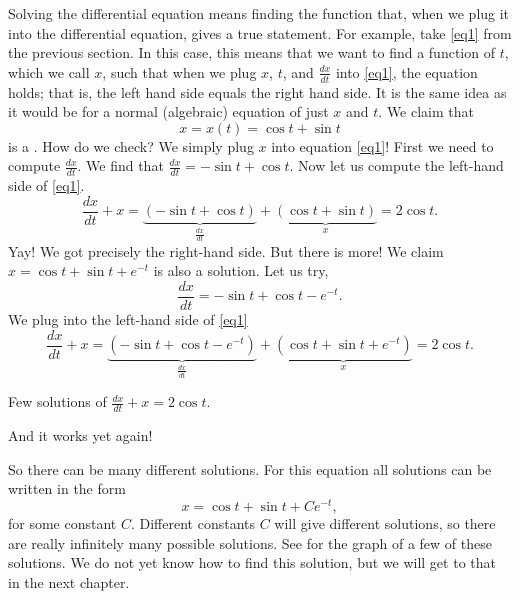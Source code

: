 Solving the differential equation means finding the function that, when we plug it into the differential equation, gives a true statement. For example, take \eqref{eq1} from the previous section. In this case, this means that we want to find a function of $t$, which we call $x$, such that when
we plug $x$, $t$, and $\frac{dx}{dt}$ into \eqref{eq1}, the equation holds;
that is, the left hand side equals the right hand side.
It is
the same idea as it would be for a normal (algebraic) equation of just
$x$ and $t$.  We claim that
\begin{equation*}
x = x(t) = \cos t + \sin t
\end{equation*}
is a \emph{}.
How do we check?  We simply plug $x$ into equation \eqref{eq1}!  First we
need to compute $\frac{dx}{dt}$.  We find that $\frac{dx}{dt} = 
-\sin t + \cos t$.  Now let us compute the left-hand side
of \eqref{eq1}.
\begin{equation*}
\frac{dx}{dt} + x = 
\underbrace{(-\sin t + \cos t)}_{\frac{dx}{dt}}
+
\underbrace{(\cos t + \sin t)}_{x}
=
2\cos t .
\end{equation*}
Yay!  We got precisely the right-hand side.
But there is more!
We claim
$x = \cos t + \sin t + e^{-t}$ is also
a solution.  Let us try,
\begin{equation*}
\frac{dx}{dt} = -\sin t + \cos t - e^{-t} .
\end{equation*}
We plug into the left-hand side of \eqref{eq1}
\begin{equation*}
\frac{dx}{dt} + x = 
\underbrace{(-\sin t + \cos t - e^{-t})}_{\frac{dx}{dt}} +
\underbrace{(\cos t + \sin t + e^{-t})}_{x}
= 2\cos t .
\end{equation*}

\begin{mywrapfig}{2.75in}
\capstart
{}
\caption{Few solutions of $\frac{dx}{dt} + x = 2 \cos t$.\label{intro:plotsfig}}
\end{mywrapfig}%

And it works yet again!

So there can be many different solutions.  For this equation all
solutions can be written in the form
\begin{equation*}
x = \cos t + \sin t + C e^{-t} ,
\end{equation*}
for some constant $C$.  Different constants $C$ will give different
solutions, so there are really infinitely many possible solutions.
See  for the graph of a
few of these solutions. 
We do not yet know how to find this solution, but we will get to that in the next chapter.

